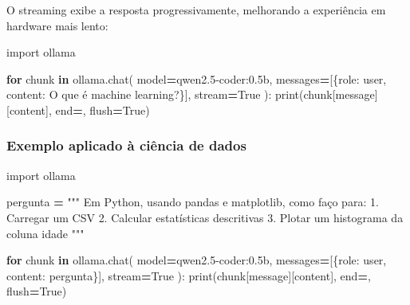 \documentclass[
]{article}
\newenvironment{Shaded}{\begin{snugshade}}{\end{snugshade}}
\newcommand{\BuiltInTok}[1]{#1}
\newcommand{\ControlFlowTok}[1]{\textcolor[rgb]{0.13,0.29,0.53}{\textbf{#1}}}
\newcommand{\ImportTok}[1]{#1}
\newcommand{\KeywordTok}[1]{\textcolor[rgb]{0.13,0.29,0.53}{\textbf{#1}}}
\newcommand{\NormalTok}[1]{#1}
\newcommand{\OperatorTok}[1]{\textcolor[rgb]{0.81,0.36,0.00}{\textbf{#1}}}
\newcommand{\StringTok}[1]{\textcolor[rgb]{0.31,0.60,0.02}{#1}}
\newcommand{\VariableTok}[1]{\textcolor[rgb]{0.00,0.00,0.00}{#1}}
\begin{document}
O streaming exibe a resposta progressivamente, melhorando a experiência
em hardware mais lento:

\begin{Shaded}
\begin{Highlighting}[]
\ImportTok{import}\NormalTok{ ollama}

\ControlFlowTok{for}\NormalTok{ chunk }\KeywordTok{in}\NormalTok{ ollama.chat(}
\NormalTok{    model}\OperatorTok{=}\StringTok{\textquotesingle{}qwen2.5{-}coder:0.5b\textquotesingle{}}\NormalTok{,}
\NormalTok{    messages}\OperatorTok{=}\NormalTok{[\{}\StringTok{\textquotesingle{}role\textquotesingle{}}\NormalTok{: }\StringTok{\textquotesingle{}user\textquotesingle{}}\NormalTok{, }\StringTok{\textquotesingle{}content\textquotesingle{}}\NormalTok{: }\StringTok{\textquotesingle{}O que é machine learning?\textquotesingle{}}\NormalTok{\}],}
\NormalTok{    stream}\OperatorTok{=}\VariableTok{True}
\NormalTok{):}
    \BuiltInTok{print}\NormalTok{(chunk[}\StringTok{\textquotesingle{}message\textquotesingle{}}\NormalTok{][}\StringTok{\textquotesingle{}content\textquotesingle{}}\NormalTok{], end}\OperatorTok{=}\StringTok{\textquotesingle{}\textquotesingle{}}\NormalTok{, flush}\OperatorTok{=}\VariableTok{True}\NormalTok{)}
\end{Highlighting}
\end{Shaded}

\subsubsection{Exemplo aplicado à ciência de
dados}\label{exemplo-aplicado-uxe0-ciuxeancia-de-dados}

\begin{Shaded}
\begin{Highlighting}[]
\ImportTok{import}\NormalTok{ ollama}

\NormalTok{pergunta }\OperatorTok{=} \StringTok{"""}
\StringTok{Em Python, usando pandas e matplotlib, como faço para:}
\StringTok{1. Carregar um CSV}
\StringTok{2. Calcular estatísticas descritivas}
\StringTok{3. Plotar um histograma da coluna \textquotesingle{}idade\textquotesingle{}}
\StringTok{"""}

\ControlFlowTok{for}\NormalTok{ chunk }\KeywordTok{in}\NormalTok{ ollama.chat(}
\NormalTok{    model}\OperatorTok{=}\StringTok{\textquotesingle{}qwen2.5{-}coder:0.5b\textquotesingle{}}\NormalTok{,}
\NormalTok{    messages}\OperatorTok{=}\NormalTok{[\{}\StringTok{\textquotesingle{}role\textquotesingle{}}\NormalTok{: }\StringTok{\textquotesingle{}user\textquotesingle{}}\NormalTok{, }\StringTok{\textquotesingle{}content\textquotesingle{}}\NormalTok{: pergunta\}],}
\NormalTok{    stream}\OperatorTok{=}\VariableTok{True}
\NormalTok{):}
    \BuiltInTok{print}\NormalTok{(chunk[}\StringTok{\textquotesingle{}message\textquotesingle{}}\NormalTok{][}\StringTok{\textquotesingle{}content\textquotesingle{}}\NormalTok{], end}\OperatorTok{=}\StringTok{\textquotesingle{}\textquotesingle{}}\NormalTok{, flush}\OperatorTok{=}\VariableTok{True}\NormalTok{)}
\end{Highlighting}
\end{Shaded}
\end{document}

